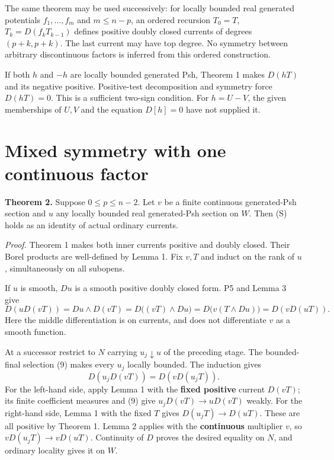 \documentclass[
  11pt,
]{article}
\begin{document}
The same theorem may be used successively: for locally bounded real
generated potentials \(f_1,\ldots,f_m\) and \(m\leq n-p\), an ordered
recursion \(T_0=T\), \(T_k=D(f_kT_{k-1})\) defines positive doubly
closed currents of degrees \((p+k,p+k)\). The last current may have top
degree. No symmetry between arbitrary discontinuous factors is inferred
from this ordered construction.

If both \(h\) and \(-h\) are locally bounded generated Psh, Theorem 1
makes \(D(hT)\) and its negative positive. Positive-test decomposition
and symmetry force \(D(hT)=0\). This is a sufficient two-sign condition.
For \(h=U-V\), the given memberships of \(U,V\) and the equation
\(D[h]=0\) have not supplied it.

\section{Mixed symmetry with one continuous
factor}\label{mixed-symmetry-with-one-continuous-factor}

\textbf{Theorem 2.} Suppose \(0\leq p\leq n-2\). Let \(v\) be a finite
continuous generated-Psh section and \(u\) any locally bounded real
generated-Psh section on \(W\). Then (S) holds as an identity of actual
ordinary currents.

\emph{Proof.} Theorem 1 makes both inner currents positive and doubly
closed. Their Borel products are well-defined by Lemma 1. Fix \(v,T\)
and induct on the rank of \(u\), simultaneously on all subopens.

If \(u\) is smooth, \(Du\) is a smooth positive doubly closed form. P5
and Lemma 3 give \[
 D(uD(vT))=Du\wedge D(vT)
          =D\bigl((vT)\wedge Du\bigr)
          =D\bigl(v(T\wedge Du)\bigr)
          =D(vD(uT)).                                         \tag{10}
\] Here the middle differentiation is on currents, and does not
differentiate \(v\) as a smooth function.

At a successor restrict to \(N\) carrying \(u_j\downarrow u\) of the
preceding stage. The bounded-final selection (9) makes every \(u_j\)
locally bounded. The induction gives
\[D(u_jD(vT))=D(vD(u_jT)).                                   \tag{11}\]
For the left-hand side, apply Lemma 1 with the \textbf{fixed positive}
current \(D(vT)\); its finite coefficient measures and (9) give
\(u_jD(vT)\to uD(vT)\) weakly. For the right-hand side, Lemma 1 with the
fixed \(T\) gives \(D(u_jT)\to D(uT)\). These are all positive by
Theorem 1. Lemma 2 applies with the \textbf{continuous} multiplier
\(v\), so \(vD(u_jT)\to vD(uT)\). Continuity of \(D\) proves the desired
equality on \(N\), and ordinary locality gives it on \(W\).
\end{document}

